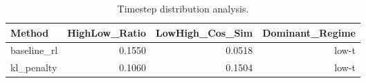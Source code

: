 \begin{table}[htbp]
\centering
\caption{Timestep distribution analysis.}
\label{tab:t_dist}
\begin{tabular}{lrrr}
\toprule
\textbf{Method} & \textbf{HighLow_Ratio} & \textbf{LowHigh_Cos_Sim} & \textbf{Dominant_Regime} \\
\midrule
baseline_rl & 0.1550 & 0.0518 & low-t \\
kl_penalty & 0.1060 & 0.1504 & low-t \\
\bottomrule
\end{tabular}
\end{table}